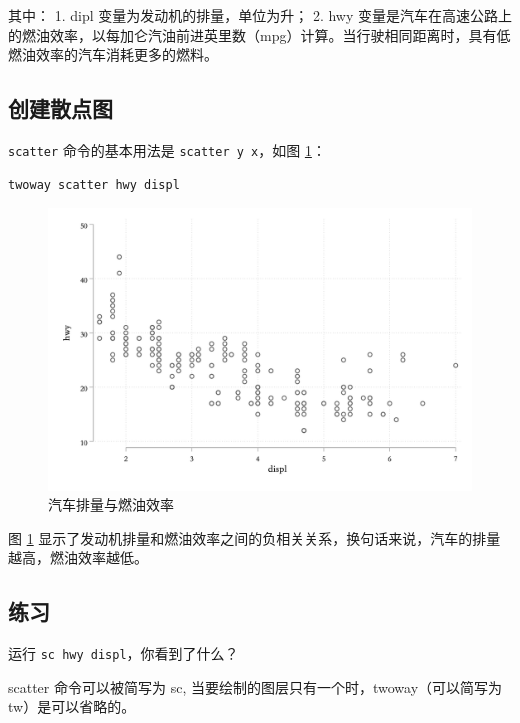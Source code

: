 其中：
1. dipl 变量为发动机的排量，单位为升；
2. hwy 变量是汽车在高速公路上的燃油效率，以每加仑汽油前进英里数（mpg）计算。当行驶相同距离时，具有低燃油效率的汽车消耗更多的燃料。

\subsection{创建散点图}

\texttt{scatter} 命令的基本用法是 \texttt{scatter\ y\ x}，如图 \ref{fig:hwydispl}：

\begin{lstlisting}
twoway scatter hwy displ
\end{lstlisting}

\begin{figure}[htbp]
  \centering
  \includegraphics[width=\textwidth]{assets/hwydispl.png}
  \caption{汽车排量与燃油效率}
  \label{fig:hwydispl}
\end{figure}

图 \ref{fig:hwydispl} 显示了发动机排量和燃油效率之间的负相关关系，换句话来说，汽车的排量越高，燃油效率越低。

\subsection{练习}

\begin{exercise}
  运行 \lstinline{sc hwy displ}，你看到了什么？
\end{exercise}

\begin{solution}
  scatter 命令可以被简写为 sc, 当要绘制的图层只有一个时，twoway（可以简写为 tw）是可以省略的。
\end{solution}

